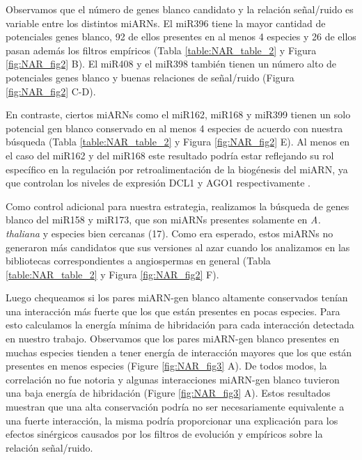Observamos que el número de genes blanco candidato y la relación señal/ruido es variable entre los distintos miARNs.
El miR396 tiene la mayor cantidad de potenciales genes blanco, 92 de ellos presentes en al menos 4 especies y 26 de ellos pasan además los filtros empíricos (Tabla \ref{table:NAR_table_2} y Figura \ref{fig:NAR_fig2} B).
El miR408 y el miR398 también tienen un número alto de potenciales genes blanco y buenas relaciones de señal/ruido (Figura \ref{fig:NAR_fig2} C-D).

En contraste, ciertos miARNs como el miR162, miR168 y miR399 tienen un solo potencial gen blanco conservado en al menos 4 especies de acuerdo con nuestra búsqueda (Tabla \ref{table:NAR_table_2} y Figura \ref{fig:NAR_fig2} E).
Al menos en el caso del miR162 y del miR168 este resultado podría estar reflejando su rol específico en la regulación por retroalimentación de la biogénesis del miARN, ya que controlan los niveles de expresión DCL1 y AGO1 respectivamente \citep{Vazquez2004,Xie2003}.

Como control adicional para nuestra estrategia, realizamos la búsqueda de genes blanco del miR158 y miR173, que son miARNs presentes solamente en \textit{A. thaliana} y especies bien cercanas (17).
Como era esperado, estos miARNs no generaron más candidatos que sus versiones al azar cuando los analizamos en las bibliotecas correspondientes a angiospermas en general (Tabla \ref{table:NAR_table_2} y Figura \ref{fig:NAR_fig2} F).

Luego chequeamos si los pares miARN-gen blanco altamente conservados tenían una interacción más fuerte que los que están presentes en pocas especies.
Para esto calculamos la energía mínima de hibridación para cada interacción detectada en nuestro trabajo. 
Observamos que los pares miARN-gen blanco presentes en muchas especies tienden a tener energía de interacción mayores que los que están presentes en menos especies (Figure \ref{fig:NAR_fig3} A).
De todos modos, la correlación no fue notoria y algunas interacciones miARN-gen blanco tuvieron una baja energía de hibridación (Figure \ref{fig:NAR_fig3} A).
Estos resultados muestran que una alta conservación podría no ser necesariamente equivalente a una fuerte interacción, la misma podría proporcionar una explicación para los efectos sinérgicos causados por los filtros de evolución y empíricos sobre la relación señal/ruido.

